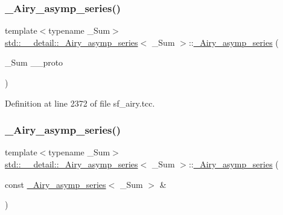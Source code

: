 \subsubsection{\texorpdfstring{\+\_\+\+Airy\+\_\+asymp\+\_\+series()}{\_Airy\_asymp\_series()}\hspace{0.1cm}{\footnotesize\ttfamily [1/3]}}
{\footnotesize\ttfamily template$<$typename \+\_\+\+Sum$>$ \\
\hyperlink{classstd_1_1____detail_1_1__Airy__asymp__series}{std\+::\+\_\+\+\_\+detail\+::\+\_\+\+Airy\+\_\+asymp\+\_\+series}$<$ \+\_\+\+Sum $>$\+::\hyperlink{classstd_1_1____detail_1_1__Airy__asymp__series}{\+\_\+\+Airy\+\_\+asymp\+\_\+series} (\begin{DoxyParamCaption}\item[{\+\_\+\+Sum}]{\+\_\+\+\_\+proto }\end{DoxyParamCaption})\hspace{0.3cm}{\ttfamily [inline]}}



Definition at line 2372 of file sf\+\_\+airy.\+tcc.

\mbox{\label{classstd_1_1____detail_1_1__Airy__asymp__series_a48eab98c05f50ad5b5f00f1ad9628e14}} 
\subsubsection{\texorpdfstring{\+\_\+\+Airy\+\_\+asymp\+\_\+series()}{\_Airy\_asymp\_series()}\hspace{0.1cm}{\footnotesize\ttfamily [2/3]}}
{\footnotesize\ttfamily template$<$typename \+\_\+\+Sum$>$ \\
\hyperlink{classstd_1_1____detail_1_1__Airy__asymp__series}{std\+::\+\_\+\+\_\+detail\+::\+\_\+\+Airy\+\_\+asymp\+\_\+series}$<$ \+\_\+\+Sum $>$\+::\hyperlink{classstd_1_1____detail_1_1__Airy__asymp__series}{\+\_\+\+Airy\+\_\+asymp\+\_\+series} (\begin{DoxyParamCaption}\item[{const \hyperlink{classstd_1_1____detail_1_1__Airy__asymp__series}{\+\_\+\+Airy\+\_\+asymp\+\_\+series}$<$ \+\_\+\+Sum $>$ \&}]{ }\end{DoxyParamCaption})\hspace{0.3cm}{\ttfamily [default]}}

